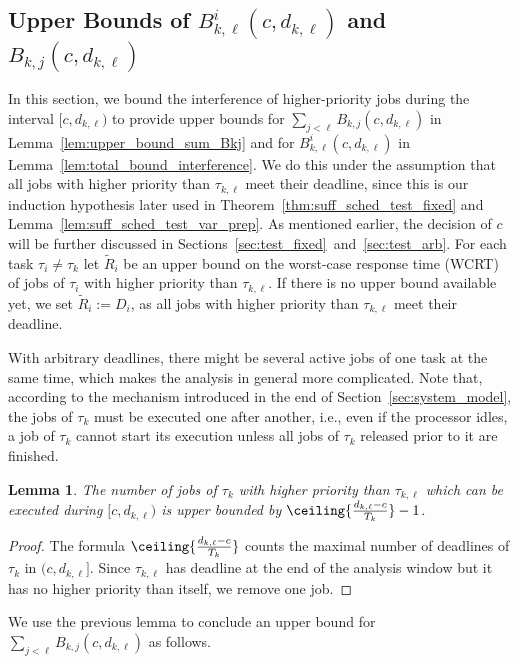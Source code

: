 \documentclass[conference]{IEEEtran}
\newtheorem{lem}[thm]{Lemma}
\theoremstyle{definition}
\theoremstyle{remark}
\newcommand{\Rtilde}{\widetilde{R}}
\begin{document}
	\subsection{Upper Bounds of $B^i_{k,\ell}(c,d_{k,\ell})$ and $B_{k,j}(c,d_{k,\ell})$}
	\label{sec:estimation_B}
	
	In this section, we bound the interference of higher-priority jobs during the interval $[c,d_{k,\ell})$ to provide upper bounds
	for $\sum_{j < \ell} B_{k,j}(c,d_{k,\ell})$ in Lemma~\ref{lem:upper_bound_sum_Bkj} and for $B_{k,\ell}^i(c, d_{k,\ell})$ in Lemma~\ref{lem:total_bound_interference}.
	We do this under the assumption that all jobs with higher priority than $\tau_{k,\ell}$ meet their deadline, since this is our induction hypothesis later used in Theorem~\ref{thm:suff_sched_test_fixed} and Lemma~\ref{lem:suff_sched_test_var_prep}.
	As mentioned earlier, the decision of $c$ will be further discussed in Sections~\ref{sec:test_fixed}~and~\ref{sec:test_arb}.
	For each task $\tau_i \neq \tau_k$ let $\Rtilde_i$ be an upper bound on the worst-case response time (WCRT) of jobs of $\tau_i$ with higher priority than $\tau_{k,\ell}$.
	If there is no upper bound available yet, we set $\Rtilde_i := D_i$, as all jobs with higher priority than $\tau_{k,\ell}$ meet their deadline.
    
	With arbitrary deadlines, there might be several active jobs of one task at the same time, which makes the analysis in general more complicated.
	Note that, according to the mechanism introduced in the end of Section~\ref{sec:system_model}, the jobs of $\tau_k$ must be executed one after another, i.e., even if the processor idles, a job of $\tau_k$ cannot start its execution unless all jobs of $\tau_k$ released prior to it are finished.
	
	\begin{lem}\label{lem:number_active_jobs}
		The number of jobs of $\tau_k$ with higher priority than $\tau_{k,\ell}$ which can be executed during $[c,d_{k,\ell})$ is upper bounded by $\ceiling{\frac{d_{k,\ell}-c}{T_k}}-1$.
	\end{lem}
	
	\begin{proof}
		The formula $\ceiling{\frac{d_{k,\ell}-c}{T_k}}$ counts the maximal number of deadlines of $\tau_k$ in $(c,d_{k,\ell}]$. Since $\tau_{k,\ell}$ has deadline at the end of the analysis window but it has no higher priority than itself, we remove one job.
	\end{proof}

	We use the previous lemma to conclude an upper bound for $\sum_{j < \ell} B_{k,j}(c,d_{k,\ell})$ as follows.
\end{document}
